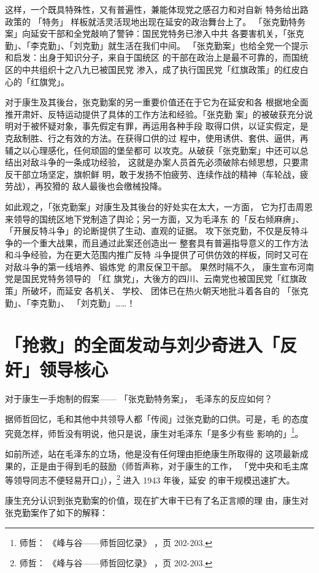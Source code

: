 这样，一个既具特殊性，又有普遍性，兼能体现党之感召力和对自新
特务给出路政策的
「特务」
样板就活灵活现地出现在延安的政治舞台上了。
「张克勤特务案」向延安干部和全党敲响了警钟：国民党特务已渗入中共
各要害机关，「张克勤」、「李克勤」、「刘克勤」就生活在我们中间。
「张克勤案」也给全党一个提示和启发：出身于知识分子，来自于国统区
的干部在政治上是最不可靠的，而国统区的中共组织十之八九已被国民党
渗入，成了执行国民党「红旗政策」的红皮白心的「红旗党」。

对于康生及其後台，张克勤案的另一重要价值还在于它为在延安和各
根据地全面推开肃奸、反特运动提供了具体的工作方法和经验。「张克勤
案」的被破获充分说明对于被怀疑对象，事先假定有罪，再运用各种手段
取得口供，以证实假定，是克敌制胜、行之有效的方法。在获得口供的过
程中，使用诱供、套供、逼供，再辅之以心理感化，任何顽固的堡垒都可
以攻克。从破获「张克勤案」中还可以总结出对敌斗争的一条成功经验，
这就是办案人员首先必须破除右倾思想，只要肃反干部立场坚定，旗帜鲜
明，敢于发扬不怕疲劳、连续作战的精神（车轮战，疲劳战），再狡猾的
敌人最後也会缴械投降。

如此观之，「张克勤案」对康生及其後台的好处实在太大，一方面，
它为打击周恩来领导的国统区地下党制造了舆论；另一方面，又为毛泽东
的「反右倾麻痹」、「开展反特斗争」的论断提供了生动、直观的证据。
攻下张克勤，不仅是反特斗争的一个重大战果，而且通过此案还创造出一
整套具有普遍指导意义的工作方法和斗争经验，为在更大范围内推广反特
斗争提供了可供仿效的样板，同时又可在对敌斗争的第一线培养、锻炼党
的肃反保卫干部。
果然时隔不久，
康生宣布河南党是国民党特务领导的
「红
旗党」，大後方的四川、云南党也被国民党「红旗政策」所破坏，而延安
各机关、
学校、
团体已在热火朝天地批斗着各自的
「张克勤」、「李克勤」、
「刘克勤」……！

\section{「抢救」的全面发动与刘少奇进入「反奸」领导核心}
对于康生一手炮制的假案——
「张克勤特务案」， 毛泽东的反应如何？

据师哲回忆，毛和其他中共领导人都「传阅」过张克勤的口供。可是，毛
的态度究竟怎样，师哲没有明说，他只是说，康生对毛泽东「是多少有些
影响的」\footnote{师哲：
《峰与谷——师哲回忆录》
，页 202-203.}。

如前所述，站在毛泽东的立场，他是没有任何理由拒绝康生所取得的
这项最新成果的，正是由于得到毛的鼓励（师哲声称，对于康生的工作，
「党中央和毛主席等领导同志不便轻易开口」），\footnote{师哲：
《峰与谷——师哲回忆录》
，页 202-203.} 进入 1943 年後，延安
的审干规模迅速扩大。

康生充分认识到张克勤案的价值，现在扩大审干已有了名正言顺的理
由，康生对张克勤案作了如下的解释：

